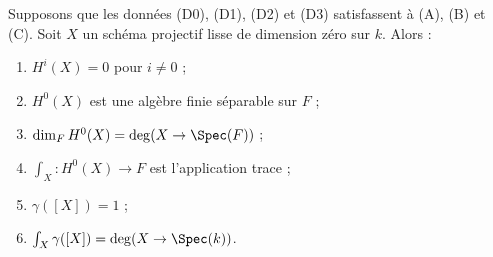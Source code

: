 \begin{lemma}
\label{lemma-dim-0}
Supposons que les données (D0), (D1), (D2) et (D3) satisfassent à (A), (B) et (C).
Soit $X$ un schéma projectif lisse de dimension zéro sur $k$.
Alors :
\begin{enumerate}
\item $H^i(X) = 0$ pour $i \not = 0$ ;
\item $H^0(X)$ est une algèbre finie séparable sur $F$ ;
\item $\dim_F H^0(X) = \deg(X \to \Spec(F))$ ;
\item $\int_X : H^0(X) \to F$ est l'application trace ;
\item $\gamma([X]) = 1$ ;
\item $\int_X \gamma([X]) = \deg(X \to \Spec(k))$.
\end{enumerate}
\end{lemma}

